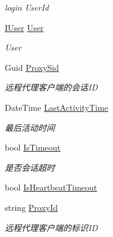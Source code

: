 \begin{DoxyCompactItemize}
\begin{DoxyCompactList}\small\item\em login User\+Id \end{DoxyCompactList}\item 
\mbox{\hyperlink{interface_t_net_1_1_context___1_1_i_user}{I\+User}} \mbox{\hyperlink{class_t_net_1_1_contract_1_1_game_session_a19c2703e318f5fa3b526d1db034c93a1}{User}}
\begin{DoxyCompactList}\small\item\em User \end{DoxyCompactList}\item 
Guid \mbox{\hyperlink{class_t_net_1_1_contract_1_1_game_session_a535f2fc1984de615058ba55605450bd1}{Proxy\+Sid}}
\begin{DoxyCompactList}\small\item\em 远程代理客户端的会话\+ID \end{DoxyCompactList}\item 
Date\+Time \mbox{\hyperlink{class_t_net_1_1_contract_1_1_game_session_aa0661d025f42ea11c4725296f2d5ba63}{Last\+Activity\+Time}}
\begin{DoxyCompactList}\small\item\em 最后活动时间 \end{DoxyCompactList}\item 
bool \mbox{\hyperlink{class_t_net_1_1_contract_1_1_game_session_ae85dc776c93c91b1a4ca8744025b1d66}{Is\+Timeout}}
\begin{DoxyCompactList}\small\item\em 是否会话超时 \end{DoxyCompactList}\item 
bool \mbox{\hyperlink{class_t_net_1_1_contract_1_1_game_session_ad67a5a483bf8769f470588952d6b08e0}{Is\+Heartbeat\+Timeout}}
\item 
string \mbox{\hyperlink{class_t_net_1_1_contract_1_1_game_session_aa0b6edbe40e494459fa84ab4b0e62198}{Proxy\+Id}}
\begin{DoxyCompactList}\small\item\em 远程代理客户端的标识\+ID \end{DoxyCompactList}\item 

\end{DoxyCompactItemize}
